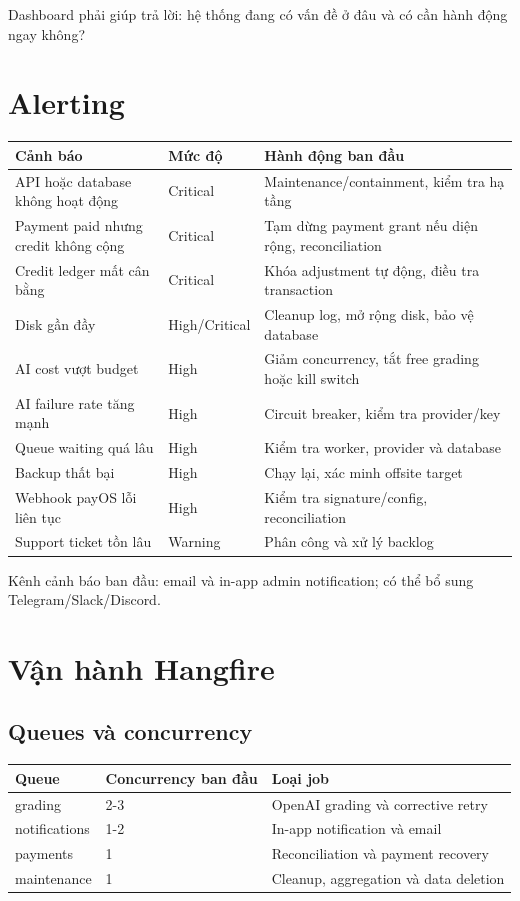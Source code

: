 \documentclass[11pt,a4paper]{article}
\begin{document}
Dashboard phải giúp trả lời: hệ thống đang có vấn đề ở đâu và có cần hành động ngay không?

\section{Alerting}

\begin{longtable}{L{0.45\textwidth}L{0.18\textwidth}L{0.27\textwidth}}
\toprule
\textbf{Cảnh báo} & \textbf{Mức độ} & \textbf{Hành động ban đầu} \\
\midrule
API hoặc database không hoạt động & Critical & Maintenance/containment, kiểm tra hạ tầng \\
Payment paid nhưng credit không cộng & Critical & Tạm dừng payment grant nếu diện rộng, reconciliation \\
Credit ledger mất cân bằng & Critical & Khóa adjustment tự động, điều tra transaction \\
Disk gần đầy & High/Critical & Cleanup log, mở rộng disk, bảo vệ database \\
AI cost vượt budget & High & Giảm concurrency, tắt free grading hoặc kill switch \\
AI failure rate tăng mạnh & High & Circuit breaker, kiểm tra provider/key \\
Queue waiting quá lâu & High & Kiểm tra worker, provider và database \\
Backup thất bại & High & Chạy lại, xác minh offsite target \\
Webhook payOS lỗi liên tục & High & Kiểm tra signature/config, reconciliation \\
Support ticket tồn lâu & Warning & Phân công và xử lý backlog \\
\bottomrule
\end{longtable}

Kênh cảnh báo ban đầu: email và in-app admin notification; có thể bổ sung Telegram/Slack/Discord.

\section{Vận hành Hangfire}

\subsection{Queues và concurrency}

\begin{longtable}{L{0.24\textwidth}L{0.22\textwidth}L{0.46\textwidth}}
\toprule
\textbf{Queue} & \textbf{Concurrency ban đầu} & \textbf{Loại job} \\
\midrule
grading & 2-3 & OpenAI grading và corrective retry \\
notifications & 1-2 & In-app notification và email \\
payments & 1 & Reconciliation và payment recovery \\
maintenance & 1 & Cleanup, aggregation và data deletion \\
\bottomrule
\end{longtable}
\end{document}
